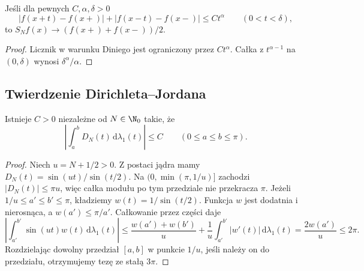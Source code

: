 \begin{wniosek}
\label{cor:dt-fourier-holder-point}
Jeśli dla pewnych $C,\alpha,\delta>0$
\[
 |f(x+t)-f(x+)|+|f(x-t)-f(x-)|
 \le Ct^\alpha\qquad(0<t<\delta),
\]
to $S_Nf(x)\to(f(x+)+f(x-))/2$.
\end{wniosek}
\begin{proof}
Licznik w warunku Diniego jest ograniczony
przez $Ct^\alpha$. Całka z $t^{\alpha-1}$
na $(0,\delta)$ wynosi $\delta^\alpha/\alpha$.
\end{proof}

\subsection{Twierdzenie Dirichleta--Jordana}

\begin{lemat}
\label{lem:dt-dirichlet-primitive}
Istnieje $C>0$ niezależne od $N\in\N_0$ takie, że
\[
 \left|\int_a^b D_N(t)\,\mathrm d\lambda_1(t)\right|
 \le C\qquad(0\le a\le b\le\pi).
\]
\end{lemat}
\begin{proof}
Niech $u=N+1/2>0$. Z postaci jądra mamy
$D_N(t)=\sin(ut)/\sin(t/2)$.
Na $(0,\min(\pi,1/u)]$ zachodzi
$|D_N(t)|\le \pi u$, więc całka modułu
po tym przedziale nie przekracza $\pi$.
Jeżeli $1/u\le a'\le b'\le\pi$, kładziemy
$w(t)=1/\sin(t/2)$. Funkcja $w$ jest
dodatnia i nierosnąca, a $w(a')\le\pi/a'$.
Całkowanie przez części daje
\[
 \left|\int_{a'}^{b'}\sin(ut)w(t)\,
 \mathrm d\lambda_1(t)\right|
 \le \frac{w(a')+w(b')}{u}
 +\frac1u\int_{a'}^{b'}|w'(t)|\,\mathrm d\lambda_1(t)
 =\frac{2w(a')}{u}\le2\pi.
\]
Rozdzielając dowolny przedział $[a,b]$
w punkcie $1/u$, jeśli należy on do przedziału,
otrzymujemy tezę ze stałą $3\pi$.
\end{proof}

